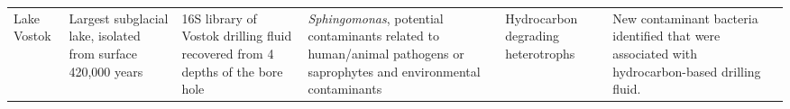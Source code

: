 \begin{landscape}
\begin{longtable}{p{2.5cm}p{3.5cm}p{2cm}p{3cm}p{2.5cm}p{5.5cm}p{3.5cm}}
Lake Vostok & Largest subglacial lake, isolated from surface 420,000 years & 16S library of Vostok drilling fluid recovered from 4 depths of the bore hole & \emph{Sphingomonas}, potential contaminants related to human/animal pathogens or saprophytes and environmental contaminants & Hydrocarbon degrading heterotrophs & New contaminant bacteria identified that were associated with hydrocarbon-based drilling fluid. &  \cite{Alekhina2007} \\

\end{longtable}
\endgroup
\end{landscape}
